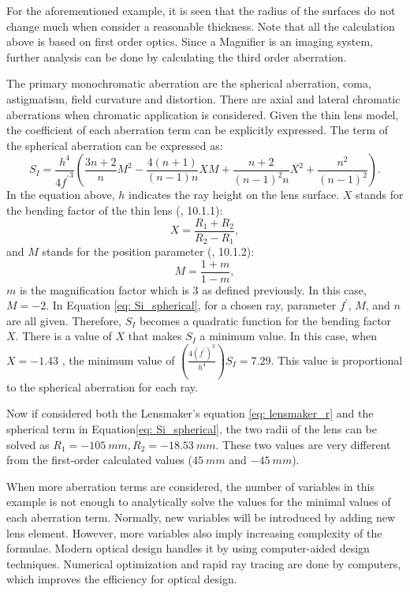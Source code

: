 For the aforementioned example, it is seen that the radius of the surfaces do not change much when consider a reasonable thickness. Note that all the calculation above is based on first order optics. Since a Magnifier is an imaging system, further analysis can be done by calculating the third order aberration. 

The primary monochromatic aberration are the spherical aberration, coma, astigmatism, field curvature and distortion. There are axial and lateral chromatic aberrations when chromatic application is considered. Given the thin lens model, the coefficient of each aberration term can be explicitly expressed. The term of the spherical aberration can be expressed as:
\begin{equation} \label{eq: Si_spherical}
    S_I = \frac{h^4}{4{f^\prime}^3}\left(\frac{3n+2}{n}M^2 - \frac{4(n+1)}{(n-1)n}XM + \frac{n+2}{(n-1)^2n}X^2 + \frac{n^2}{(n-1)^2}\right).
\end{equation}                            %
In the equation above, $h$ indicates the ray height on the lens surface. $X$ stands for the bending factor of the thin lens (\cite{GrossHBOvol1}, 10.1.1):
\begin{equation} \label{eqn: bending factor}
X = \frac{R_1+R_2}{R_2-R_1},
\end{equation}and $M$ stands for the position parameter (\cite{GrossHBOvol1}, 10.1.2):
\begin{equation} \label{eqn: position parameter}
M = \frac{1+m}{1-m},
\end{equation}$m$ is the magnification factor which is $3$ as defined previously. In this case, $M=-2$. In Equation \ref{eq: Si_spherical}, for a chosen ray, parameter $f^\prime$, $M$, and $n$ are all given. Therefore, $S_I$ becomes a quadratic function for the bending factor $X$. There is a value of $X$ that makes $S_I$ a minimum value. In this case, when $X = -1.43$ , the minimum value of $(\frac{4(f^\prime)^3}{h^4})S_I = 7.29$. This value is proportional to the spherical aberration for each ray. 

Now if considered both the Lensmaker's equation \ref{eq: lensmaker_r} and the spherical term in Equation\ref{eq: Si_spherical}, the two radii of the lens can be solved as $R_1 = -105 \ mm, R_2 = -18.53 \ mm$. These two values are very different from the first-order calculated values ($45 \ mm$ and $-45 \ mm$). 

When more aberration terms are considered, the number of variables in this example is not enough to analytically solve the values for the minimal values of each aberration term. Normally, new variables will be introduced by adding new lens element. However, more variables also imply increasing complexity of the formulae. Modern optical design handles it by using computer-aided design techniques. Numerical optimization and rapid ray tracing are done by computers, which improves the efficiency for optical design. 


